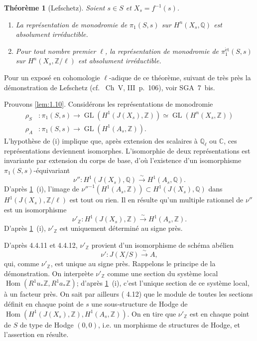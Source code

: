 \documentclass[10pt,leqno]{amsart}
\theoremstyle{plain}
\newtheorem*{itheorem}{Th\'eor\`eme}
\theoremstyle{definition}
\theoremstyle{remark}
\DeclareMathOperator{\GL}{GL}
\DeclareMathOperator{\Hom}{Hom}
\newcommand{\ZZ}{\mathbb{Z}}
\newcommand{\QQ}{\mathbb{Q}}
\newcommand{\CC}{\mathbb{C}}
\begin{document}
\begin{itheorem}[Lefschetz]\label{thm:1.11}
Soient $s\in S$ et $X_s=f^{-1}(s)$.
\begin{enumerate}
\item[(i)] La repr\'esentation de monodromie de $\pi_1(S,s)$ sur $H^n(X_s,\QQ)$ est absolument irr\'eductible.
\item[(ii)] Pour tout nombre premier $\ell$, la repr\'esentation de monodromie de $\pi_1^{\mathrm{\acute{e}t}}(S,s)$ sur $H^n(X_s,\ZZ/\ell)$ est absolument irr\'eductible.
\end{enumerate}
\end{itheorem}

Pour un expos\'e en cohomologie $\ell$-adique de ce th\'eor\`eme, suivant de tr\`es pr\`es la d\'emonstration de Lefschetz (cf.~\cite{6} Ch~V, III~p.~106), voir SGA~7~bis.

Prouvons \ref{lem:1.10}. Consid\'erons les repr\'esentations de monodromie
\begin{align*}
\rho_S&\colon\pi_1(S,s)\to\GL(H^1(J(X_s),\ZZ))\simeq\GL(H^n(X_s,\ZZ))\\
\rho_A&\colon\pi_1(S,s)\to\GL(H^1(A_s,\ZZ)).
\end{align*}
L'hypoth\`ese de (i) implique que, apr\`es extension des scalaires \`a $\QQ_\ell$ ou $\CC$, ces repr\'esentations deviennent isomorphes. L'isomorphie de deux repr\'esentations est invariante par extension du corps de base, d'o\`u l'existence d'un isomorphisme $\pi_1(S,s)$-\'equivariant
\[
\nu''\colon H^1(J(X_s),\QQ)\xrightarrow{\sim}H^1(A_s,\QQ).
\]
D'apr\`es \ref{thm:1.11}~(i), l'image de $\nu''^{-1}(H^1(A_s,\ZZ))\subset H^1(J(X_s),\QQ)$ dans $H^1(J(X_s),\ZZ/\ell)$ est tout ou rien. Il en r\'esulte qu'un multiple rationnel de $\nu''$ est un isomorphisme
\[
\nu'_\ZZ\colon H^1(J(X_s),\ZZ)\xrightarrow{\sim}H^1(A_s,\ZZ).
\]
D'apr\`es \ref{thm:1.11}~(i), $\nu'_\ZZ$ est uniquement d\'etermin\'e au signe pr\`es.

D'apr\`es \cite{3} 4.4.11 et 4.4.12, $\nu'_\ZZ$ provient d'un isomorphisme de sch\'ema ab\'elien
\[
\nu'\colon J(X/S)\xrightarrow{\sim}A,
\]
qui, comme $\nu'_\ZZ$, est unique au signe pr\`es. Rappelons le principe de la d\'emonstration. On interpr\`ete $\nu'_\ZZ$ comme une section du syst\`eme local $\Hom(R^1u_*\ZZ,R^1a_*\ZZ)$; d'apr\`es \ref{thm:1.11}~(i), c'est l'unique section de ce syst\`eme local, \`a un facteur pr\`es. On sait par ailleurs (\cite{3} 4.12) que le module de toutes les sections d\'efinit en chaque point de $s$ une sous-structure de Hodge de $\Hom(H^1(J(X_s),\ZZ),H^1(A_s,\ZZ))$. On en tire que $\nu'_\ZZ$ est en chaque point de $S$ de type de Hodge $(0,0)$, i.e. un morphisme de structures de Hodge, et l'assertion en r\'esulte.
\end{document}
